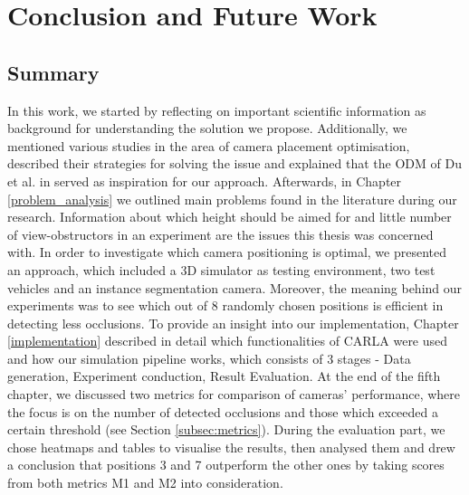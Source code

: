 \chapter{Conclusion and Future Work}
\label{conclusion}
\section{Summary}
In this work, we started by reflecting on important scientific information as background for understanding the solution we propose. Additionally, we mentioned various studies in the area of camera placement optimisation, described their strategies for solving the issue and explained that the ODM of Du et al. in \cite{occlusion_degree_model} served as inspiration for our approach. Afterwards, in Chapter \ref{problem_analysis} we outlined main problems found in the literature during our research. Information about which height should be aimed for and little number of view-obstructors in an experiment are the issues this thesis was concerned with. In order to investigate which camera positioning is optimal, we presented an approach, which included a 3D simulator as testing environment, two test vehicles and an instance segmentation camera. Moreover, the meaning behind our experiments was to see which out of 8 randomly chosen positions is efficient in detecting less occlusions. To provide an insight into our implementation, Chapter \ref{implementation} described in detail which functionalities of CARLA were used and how our simulation pipeline works, which consists of 3 stages - Data generation, Experiment conduction, Result Evaluation. At the end of the fifth chapter, we discussed two metrics for comparison of cameras' performance, where the focus is on the number of detected occlusions and those which exceeded a certain threshold (see Section \ref{subsec:metrics}). During the evaluation part, we chose heatmaps and tables to visualise the results, then analysed them and drew a conclusion that positions 3 and 7 outperform the other ones by taking scores from both metrics M1 and M2 into consideration.

